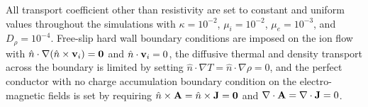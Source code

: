All transport coefficient other than resistivity are set to constant and uniform values throughout the simulations with $\kappa=10^{-2}$, $\mu_i=10^{-2}$, $\mu_e=10^{-3}$, and $D_\rho=10^{-4}$.  Free-slip hard wall boundary conditions are imposed on the ion flow with $\hat{n}\cdot\nabla(\hat{n}\times\mathbf{v}_i)=\mathbf{0}$ and $\hat{n}\cdot\mathbf{v}_i=0$, the diffusive thermal and density transport across the boundary is limited by setting $\hat{n}\cdot\nabla T=\hat{n}\cdot\nabla\rho=0$, and the perfect conductor with no charge accumulation boundary condition on the electro-magnetic fields is set by requiring $\hat{n}\times\mathbf{A}=\hat{n}\times\mathbf{J}=\mathbf{0}$ and $\nabla\cdot\mathbf{A}=\nabla\cdot\mathbf{J}=0$.


